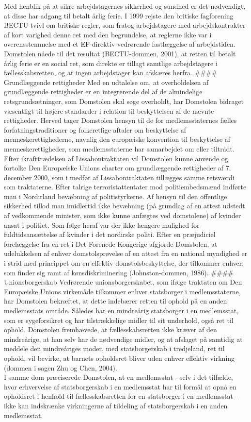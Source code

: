 \documentclass[]{book}
\begin{document}
Med henblik på at sikre arbejdstagernes sikkerhed og sundhed er det nødvendigt, at disse har adgang til betalt årlig ferie. I 1999 rejste den britiske fagforening BECTU tvivl om britiske regler, som fratog arbejdstagere med arbejdskontrakter af kort varighed denne ret med den begrundelse, at reglerne ikke var i overensstemmelse med et EF-direktiv vedrørende fastlæggelse af arbejdstiden. Domstolen nåede til det resultat (BECTU-dommen, 2001), at retten til betalt årlig ferie er en social ret, som direkte er tillagt samtlige arbejdstagere i fællesskabsretten, og at ingen arbejdstager kan afskæres herfra.
\#\#\#\# Grundlæggende rettigheder
Med en udtalelse om, at overholdelsen af grundlæggende rettigheder er en integrerende del af de almindelige retsgrundsætninger, som Domstolen skal søge overholdt, har Domstolen bidraget væsentligt til højere standarder i relation til beskyttelsen af de nævnte rettigheder. Herved tager Domstolen hensyn til de for medlemsstaternes fælles forfatningstraditioner og folkeretlige aftaler om beskyttelse af menneskerettighederne, navnlig den europæiske konvention til beskyttelse af menneskerettigheder, som medlemsstaterne har samarbejdet om eller tiltrådt. Efter ikrafttrædelsen af Lissabontraktaten vil Domstolen kunne anvende og fortolke Den Europæiske Unions charter om grundlæggende rettigheder af 7. december 2000, som i medfør af Lissabontraktaten tillægges samme retsværdi som traktaterne.
Efter talrige terroristattentater mod politiembedsmænd indførte man i Nordirland bevæbning af politistyrkerne. Af hensyn til den offentlige sikkerhed tillod man imidlertid ikke bevæbning (på grundlag af en attest udstedt af vedkommende minister, som ikke kunne anfægtes ved domstolene) af kvinder ansat i politiet. Som følge heraf var der ikke længere mulighed for fuldtidsansættelse af kvinder i det nordirske politi. Efter en præjudiciel forelæggelse fra en ret i Det Forenede Kongerige afgjorde Domstolen, at udelukkelsen af enhver domstolsprøvelse af en attest fra en national myndighed er i strid med princippet om en effektiv domstolsbeskyttelse, der tilkommer enhver, som finder sig ramt af kønsdiskriminering (Johnston-dommen, 1986).
\#\#\#\# Unionsborgerskab
Vedrørende unionsborgerskabet, som ifølge traktaten om Den Europæiske Unions virkemåde tilkommer enhver statsborger i medlemsstaterne, har Domstolen bekræftet, at dette indebærer retten til ophold på en anden medlemsstats område. Således har en mindreårig statsborger i en medlemsstat, som er sygeforsikret og har tilstrækkelige midler til sit underhold, også ret til ophold. Domstolen fremhævede, at fællesskabsretten ikke kræver af den mindreårige, at han selv har de nødvendige midler, og at afslaget på samtidig at meddele den mindreåriges moder, med statsborgerskab i tredjeland, ret til ophold, vil bevirke, at barnets opholdsret bliver uden enhver effektiv virkning (dommen i sagen Zhu og Chen, 2004).\\
I samme dom præciserede Domstolen, at en medlemsstat - selv i det tilfælde, hvor erhvervelse af statsborgerskab i en medlemsstat har til formål at opnå en opholdsret i henhold til fællesskabsretten for en statsborger i en medlemsstat - ikke kan indskrænke virkningerne af tildeling af statsborgerskab i en anden medlemsstat.
\end{document}
